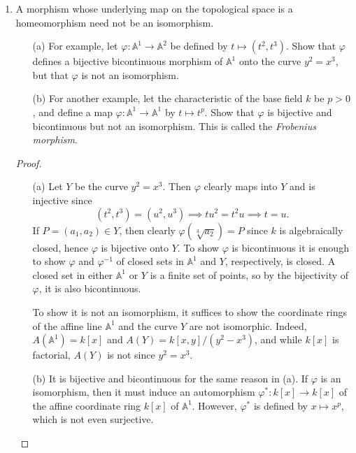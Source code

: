 \documentclass[12pt]{article}
\newcommand{\A}{\mathbb{A}}
\theoremstyle{definition}
\begin{document}
\begin{enumerate} [label=\textbf{\arabic*.}, leftmargin=-0.05em]

\item A morphism whose underlying map on the topological space is a homeomorphism need not be an isomorphism.
\begin{itemize}
    \item[(a)] For example, let $\varphi : \A^1 \to \A^2$ be defined by $t \mapsto (t^2, t^3)$. Show that $\varphi$ defines a bijective bicontinuous morphism of $\A^1$ onto the curve $y^2 = x^3$, but that $\varphi$ is not an isomorphism.

    \item[(b)] For another example, let the characteristic of the base field $k$ be $p > 0$, and define a map $\varphi : \A^1 \to \A^1$ by $t \mapsto t^p$. Show that $\varphi$ is bijective and bicontinuous but not an isomorphism. This is called the \textit{Frobenius morphism}.
\end{itemize}

\begin{proof} $ $ \vspace{0pt}
   \begin{itemize}
    \item[(a)] Let $Y$ be the curve $y^2 = x^3$. Then $\varphi$ clearly maps into $Y$ and is injective since
    \begin{equation*}
        (t^2, t^3) = (u^2, u^3) \implies tu^2 = t^2u \implies t = u.
    \end{equation*}
    If $P = (a_1, a_2) \in Y$, then clearly $\varphi(\sqrt[3]{a_2}) = P$ since $k$ is algebraically closed, hence $\varphi$ is bijective onto $Y$. To show $\varphi$ is bicontinuous it is enough to show $\varphi$ and $\varphi^{-1}$ of closed sets in $\A^1$ and $Y$, respectively, is closed. A closed set in either $\A^1$ or $Y$ is a finite set of points, so by the bijectivity of $\varphi$, it is also bicontinuous.

    To show it is not an isomorphism, it suffices to show the coordinate rings of the affine line $\A^1$ and the curve $Y$ are not isomorphic. Indeed, $A(\A^1) = k[x]$ and $A(Y) = k[x, y] / (y^2 - x^3)$, and while $k[x]$ is factorial, $A(Y)$ is not since $y^2 = x^3$.

    \item[(b)] It is bijective and bicontinuous for the same reason in (a). If $\varphi$ is an isomorphism, then it must induce an automorphism $\varphi^* : k[x] \to k[x]$ of the affine coordinate ring $k[x]$ of $\A^1$. However, $\varphi^*$ is defined by $x \mapsto x^p$, which is not even surjective.
   \end{itemize} 
\end{proof}


\end{enumerate}
\end{document}

